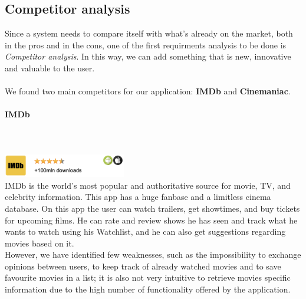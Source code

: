 \documentclass[12pt, a4paper]{article}
\numberwithin{figure}{section}
\begin{document}

\subsection{Competitor analysis}

Since a system needs to compare itself with what’s already on the market, both in the pros and in 
the cons, one of the first requirments analysis to be done is \textit{Competitor analysis}. 
In this way, we can add something that is new, innovative and valuable to the user.\\\\
We found two main competitors for our application: \textbf{IMDb} and \textbf{Cinemaniac}.
\paragraph{IMDb}\mbox{}\\\\
\includegraphics[width=0.4\textwidth]{Images/IMDb.png}\\
IMDb is the world's most popular and authoritative source for movie, TV, and celebrity information. This app has a
huge fanbase and a limitless cinema database.
On this app the user can watch trailers, get showtimes, and buy tickets for upcoming films. He can rate and review shows he has seen
and track what he wants to watch using his Watchlist, and he can also get suggestions regarding movies based on it.\\
However, we have identified few weaknesses, such as the impossibility to exchange opinions between users, to keep track
of already watched movies and to save favourite movies in a list; it is also not very intuitive to retrieve movies specific
information due to the high number of functionality offered by the application.
\end{document}

